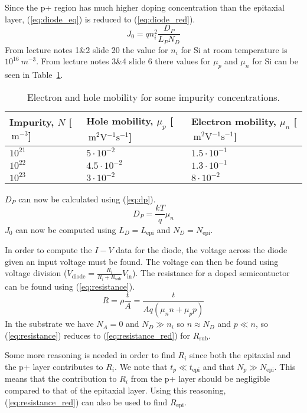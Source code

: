 \documentclass[12pt,a4paper]{article}
\begin{document}
Since the p+ region has much higher doping concentration than the epitaxial layer, (\ref{eq:diode_eq}) is reduced to (\ref{eq:diode_red}).
\begin{equation}
  \label{eq:diode_red}
  J_0 = q n^{2}_{i} \frac{D_P}{L_PN_D}
\end{equation}
From lecture notes 1\&2 slide 20 the value for $n_{i}$ for Si at room temperature is $10^{16}\SI{}{m^{-3}}$.
From lecture notes 3\&4 slide 6 there values for $\mu_p$ and $\mu_n$ for Si can be seen in Table~\ref{tab:mobility}.
\begin{table}
  \centering
  \caption{Electron and hole mobility for some impurity concentrations.}
  \begin{tabular}{|l|l|l|} \hline
    Impurity, $N$ [$\SI{}{\metre^{-3}}$] & Hole mobility, $\mu_p$ [$\SI{}{\metre^{2}\volt^{-1}\second^{-1}}$] & Electron mobility, $\mu_n$ [$\SI{}{\metre^{2}\volt^{-1}\second^{-1}}$] \\\hline
    $10^{21}$ & $5\cdot 10^{-2}$ & $1.5\cdot 10^{-1}$ \\\hline
    $10^{22}$ & $4.5\cdot 10^{-2}$ & $1.3\cdot 10^{-1}$ \\\hline
    $10^{23}$ & $3\cdot 10^{-2}$ & $8\cdot 10^{-2}$ \\\hline
  \end{tabular}
  \label{tab:mobility}
\end{table}
$D_P$ can now be calculated using (\ref{eq:dp}).
\begin{equation}
  \label{eq:dp}
  D_P = \frac{k T}{q}\mu_n
\end{equation}
$J_0$ can now be computed using $L_D=L_{\text{epi}}$ and $N_D=N_{\text{epi}}$.

In order to compute the $I-V$ data for the diode, the voltage across the diode given an input voltage must be found.
The voltage can then be found using voltage division ($V_{\text{diode}}=\frac{R_i}{R_i+R_{\text{sub}}}V_{\text{in}}$).
The resistance for a doped semicontuctor can be found using (\ref{eq:resistance}).
\begin{equation}
  \label{eq:resistance}
  R=\rho\frac{t}{A}=\frac{t}{A q (\mu_nn + \mu_pp)}
\end{equation}
In the substrate we have $N_A=0$ and $N_D\gg n_i$ so $n \approx N_D$ and $p \ll n$, so (\ref{eq:resistance}) reduces to (\ref{eq:resistance_red}) for $R_{\text{sub}}$.

Some more reasoning is needed in order to find $R_i$ since both the epitaxial and the p+ layer contributes to $R_i$.
We note that $t_p \ll t_{\text{epi}}$ and that $N_p \gg N_{\text{epi}}$.
This means that the contribution to $R_i$ from the p+ layer should be negligible compared to that of the epitaxial layer.
Using this reasoning, (\ref{eq:resistance_red}) can also be used to find $R_{\text{epi}}$.
\end{document}
